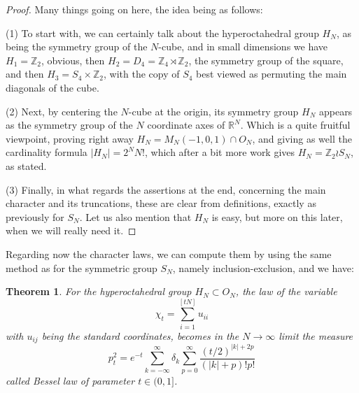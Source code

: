 \documentclass[12pt]{amsbook}
\newtheorem{theorem}{Theorem}[chapter]
\begin{document}
\begin{proof}
Many things going on here, the idea being as follows:

\medskip

(1) To start with, we can certainly talk about the hyperoctahedral group $H_N$, as being the symmetry group of the $N$-cube, and in small dimensions we have $H_1=\mathbb Z_2$, obvious, then $H_2=D_4=\mathbb Z_4\rtimes\mathbb Z_2$, the symmetry group of the square, and then $H_3=S_4\times\mathbb Z_2$, with the copy of $S_4$ best viewed as permuting the main diagonals of the cube.

\medskip

(2) Next, by centering the $N$-cube at the origin, its symmetry group $H_N$ appears as the symmetry group of the $N$ coordinate axes of $\mathbb R^N$. Which is a quite fruitful viewpoint, proving right away $H_N=M_N(-1,0,1)\cap O_N$, and giving as well the cardinality formula $|H_N|=2^NN!$, which after a bit more work gives $H_N=\mathbb Z_2\wr S_N$, as stated.

\medskip

(3) Finally, in what regards the assertions at the end, concerning the main character and its truncations, these are clear from definitions, exactly as previously for $S_N$. Let us also mention that $H_N$ is easy, but more on this later, when we will really need it.
\end{proof}

Regarding now the character laws, we can compute them by using the same method as for the symmetric group $S_N$, namely inclusion-exclusion, and we have:


\begin{theorem}
For the hyperoctahedral group $H_N\subset O_N$, the law of the variable
$$\chi_t=\sum_{i=1}^{[tN]}u_{ii}$$
with $u_{ij}$ being the standard coordinates, becomes in the $N\to\infty$ limit the measure
$$p^2_t=e^{-t}\sum_{k=-\infty}^\infty\delta_k\sum_{p=0}^\infty \frac{(t/2)^{|k|+2p}}{(|k|+p)!p!}$$ 
called Bessel law of parameter $t\in(0,1]$.
\end{theorem}
\end{document}
